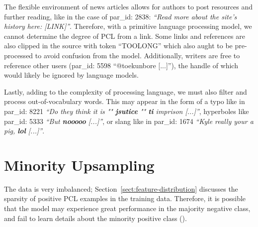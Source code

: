 \documentclass[11pt,a4paper]{article}
\begin{document}
The flexible environment of news articles allows for authors to post resources and further reading, like in the case of par\_id: 2838: \emph{``Read more about the site's history here: [LINK]''}. Therefore, with a primitive language processing model, we cannot determine the degree of PCL from a link. Some links and references are also clipped in the source with token ``TOOLONG'' which also aught to be pre-processed to avoid confusion from the model. Additionally, writers are free to reference other users (par\_id: 5598 ``@toekunbore [...]''), the handle of which would likely be ignored by language models.

Lastly, adding to the complexity of processing language, we must also filter and process out-of-vocabulary words. This may appear in the form of a typo like in par\_id: 8221 \emph{``Do they think it is "" \textbf{jsutice} "" \textbf{ti} imprison [...]''}, hyperboles like par\_id: 5333 \emph{``But \textbf{nooooo} [...]''}, or slang like in par\_id: 1674 \emph{``Kyle really your a pig, \textbf{lol} [...]''}.



\section{Minority Upsampling}

The data is very imbalanced; Section~\ref{sect:feature-distribution} discusses the sparsity of positive PCL examples in the training data. Therefore, it is possible that the model may experience great performance in the majority negative class, and fail to learn details about the minority positive class (\citet{alberto-imbalanced-datasets}).
\end{document}

